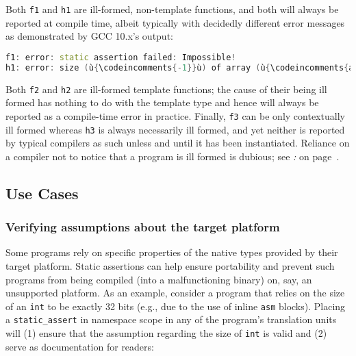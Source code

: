 \noindent Both \texttt{f1} and \texttt{h1} are ill-formed, non-template functions,
and both will always be reported at compile time, albeit typically with
decidedly different error messages as demonstrated by GCC 10.x's output:

\begin{lstlisting}[language=C++]
f1: error: static assertion failed: Impossible!
h1: error: size (ù{\codeincomments{-1}}ù) of array (ù{\codeincomments{a}}ù) is negative
\end{lstlisting}

\noindent Both \texttt{f2} and \texttt{h2} are ill-formed template functions; the cause of their being ill formed has nothing to do with the
template type and hence will always be reported as a compile-time error
in practice. Finally, \texttt{f3} can be only contextually ill formed
whereas \texttt{h3} is always necessarily ill formed, and yet neither is
reported by typical compilers as such unless and until it has been
instantiated. Reliance on a compiler not to notice that a program is
ill formed is dubious; see {\it{}: } on page~\pageref{static-assertions-in-templates-can-trigger-unintended-compilation-failures}.

\subsection[Use Cases]{Use Cases}\label{use-cases}

\subsubsection[Verifying assumptions about the target platform]{Verifying assumptions about the target platform}\label{verifying-assumptions-about-the-target-platform}

Some programs rely on specific properties of the native types provided
by their target platform. Static assertions can help ensure portability
and prevent such programs from being compiled (into a malfunctioning
binary) on, say, an unsupported platform. As an example, consider a
program that relies on the size of an \texttt{int} to be exactly 32
bits (e.g., due to the use of inline \texttt{asm} blocks). Placing a
\texttt{static\_assert} in namespace scope in any of the program's
translation units will (1) ensure that the assumption regarding the size
of \texttt{int} is valid and (2) serve as documentation for readers:

